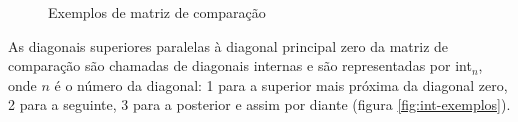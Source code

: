\begin{figure}
  \vspace{2em}
  \centering
  \qquad
  \qquad
  \caption{Exemplos de matriz de comparação}
  \label{fig:matriz-exemplos}
\end{figure}

As diagonais superiores paralelas à diagonal principal zero da matriz
de comparação são chamadas de diagonais internas e são representadas
por int$_n$, onde $n$ é o número da diagonal: 1 para a superior mais
próxima da diagonal zero, 2 para a seguinte, 3 para a posterior e
assim por diante (figura \ref{fig:int-exemplos}).

